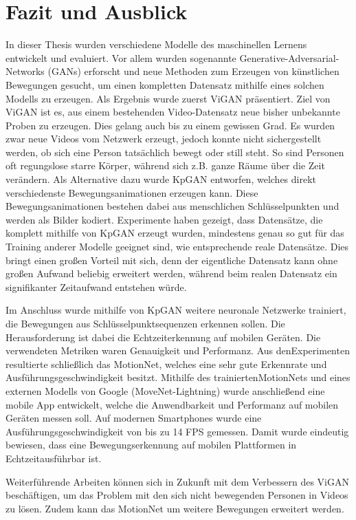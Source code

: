 \chapter{Fazit und Ausblick}
In dieser Thesis wurden verschiedene Modelle des maschinellen Lernens entwickelt
und evaluiert. Vor allem wurden sogenannte Generative-Adversarial-Networks
(GANs) erforscht und neue Methoden zum Erzeugen von künstlichen Bewegungen
gesucht, um einen kompletten Datensatz mithilfe eines solchen Modells zu
erzeugen. Als Ergebnis wurde zuerst ViGAN präsentiert. Ziel von ViGAN ist es,
aus einem bestehenden Video-Datensatz neue bisher unbekannte Proben zu erzeugen.
Dies gelang auch bis zu einem gewissen Grad. Es wurden zwar neue Videos vom
Netzwerk erzeugt, jedoch konnte nicht sichergestellt werden, ob sich eine Person
tatsächlich bewegt oder still steht.  So sind Personen oft regungslose starre
Körper, während sich z.B. ganze Räume über die Zeit verändern. Als Alternative
dazu wurde KpGAN entworfen, welches direkt verschiedenste Bewegungsanimationen
erzeugen kann. Diese Bewegungsanimationen bestehen dabei aus menschlichen
Schlüsselpunkten und werden als Bilder kodiert.  Experimente haben gezeigt, dass
Datensätze, die komplett mithilfe von KpGAN erzeugt wurden, mindestens genau so
gut für das Training anderer Modelle geeignet sind, wie entsprechende reale
Datensätze.  Dies bringt einen großen Vorteil mit sich, denn der eigentliche
Datensatz kann ohne großen Aufwand beliebig erweitert werden, während beim
realen Datensatz ein signifikanter Zeitaufwand entstehen würde.

Im Anschluss wurde mithilfe von KpGAN weitere neuronale Netzwerke trainiert, die
Bewegungen aus Schlüsselpunktsequenzen erkennen sollen.  Die Herausforderung ist
dabei die Echtzeiterkennung auf mobilen Geräten. Die verwendeten Metriken waren
Genauigkeit und Performanz. Aus denExperimenten resultierte schließlich das
MotionNet, welches eine sehr gute Erkennrate und Ausführungsgeschwindigkeit
besitzt.  Mithilfe des trainiertenMotionNets und eines externen Modells von
Google (MoveNet-Lightning) wurde anschließend eine mobile App entwickelt, welche
die Anwendbarkeit und Performanz auf mobilen Geräten messen soll. Auf modernen
Smartphones wurde eine Aus\-führ\-ungs\-ge\-schwindig\-keit von bis zu 14 FPS
gemessen.  Damit wurde eindeutig bewiesen, dass eine Bewegungserkennung auf
mobilen Plattformen in Echtzeitausführbar ist.

Weiterführende Arbeiten können sich in Zukunft mit dem Verbessern des ViGAN
be\-schäf\-tigen, um das Problem mit den sich nicht bewegenden Personen in
Videos zu lösen. Zudem kann das MotionNet um weitere Bewegungen erweitert
werden.